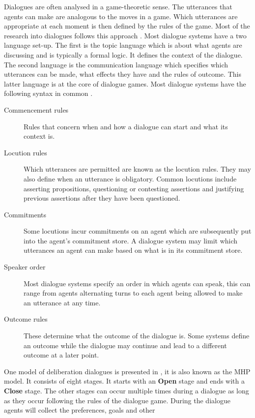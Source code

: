Dialogues are often analysed in a game-theoretic sense. The utterances
that agents can make are analogous to the moves in a game. Which utterances are
appropriate at each moment is then defined by the rules of the game. Most of
the research into dialogues follows this approach
\cite{prakken2006,prakken2009}. Most dialogue systems have a two language
set-up. The first is the topic language which is about what agents are
discussing and is typically a formal logic. It defines the context of the
dialogue. The second language is the communication language which specifies
which utterances can be made, what effects they have and the rules of outcome.
This latter language is at the core of dialogue games. Most dialogue systems
have the following syntax in common \cite{prakken2006,prakken2009,mcburney2009}.
\begin{description}
    \item[Commencement rules] Rules that concern when and how a dialogue can
    start and what its context is.
    \item[Locution rules] Which utterances are permitted are known as the
    locution rules. They may also define when an utterance is obligatory.
    Common locutions include asserting propositions, questioning or contesting
    assertions and justifying previous assertions after they have been
    questioned.
    \item[Commitments] Some locutions incur commitments on an agent which are
    subsequently put into the agent's commitment store. A dialogue system may
    limit which utterances an agent can make based on what is in its commitment
    store.
    \item[Speaker order] Most dialogue systems specify an order in which agents
    can speak, this can range from agents alternating turns to each agent being
    allowed to make an utterance at any time.
    \item[Outcome rules] These determine what the outcome of the dialogue is.
    Some systems define an outcome while the dialogue may continue and lead to
    a different outcome at a later point.
\end{description}
One model of deliberation dialogues is presented in \cite{mcburney2007}, it is
also known as the MHP model. It
consists of eight stages. It starts with an \textbf{Open} stage and ends with
a \textbf{Close} stage. The other stages can occur multiple times during a
dialogue as long as they occur following the rules of the dialogue game.
During the dialogue agents will collect the preferences, goals and other
